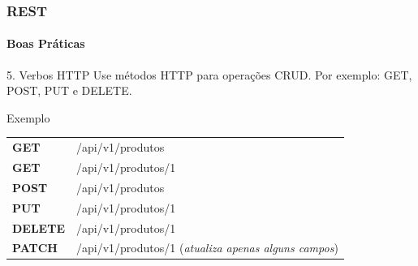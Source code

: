 \documentclass[
	10pt, %
	t, %
]{beamer}
\newcommand{\yellowbox}[1]{\colorbox{yellow!75}{#1}}
\begin{document}
\begin{frame}
	\frametitle{REST}
	\framesubtitle{Boas Práticas}

	\begin{block}{5. Verbos HTTP}
		Use métodos HTTP para operações CRUD. Por exemplo: \yellowbox{GET, POST, PUT e DELETE}. 
	\end{block}

	\begin{exampleblock}{Exemplo}
		\begin{tabular}{@{}ll@{}}
			\yellowbox{\textbf{GET}}    &  /api/v1/produtos \\
			\yellowbox{\textbf{GET}}    &  /api/v1/produtos/1 \\
			\yellowbox{\textbf{POST}}   &  /api/v1/produtos \\
			\yellowbox{\textbf{PUT}}    &  /api/v1/produtos/1 \\
			\yellowbox{\textbf{DELETE}} &  /api/v1/produtos/1 \\
			\yellowbox{\textbf{PATCH}}  &  /api/v1/produtos/1 (\textit{atualiza apenas alguns campos})
		\end{tabular}
	\end{exampleblock}

\end{frame}
\end{document}
